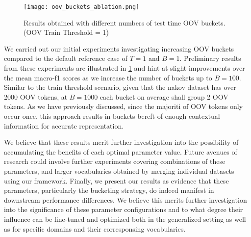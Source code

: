 \documentclass[../../fyp.tex]{subfiles}
\begin{document}
\begin{figure}[!ht]
	\centering
	\texttt{[image: oov\_buckets\_ablation.png]}
	\caption{Results obtained with different numbers of test time OOV buckets. (OOV Train Threshold = 1)}
	\label{fig:oov_threshold_ablation}
\end{figure}

We carried out our initial experiments investigating increasing OOV buckets compared to the default reference case of $T=1$ and $B=1$. Preliminary results from these experiments are illustrated in \ref{fig:oov_threshold_ablation} and hint at slight improvements over the mean macro-f1 scores as we increase the number of buckets up to $B=100$. Similar to the train threshold scenario, given that the nakov dataset has over 2000 OOV tokens, at $B=1000$ each bucket on average shall group 2 OOV tokens. As we have previously discussed, since the majoriti of OOV tokens only occur once, this approach results in buckets bereft of enough contextual information for accurate representation. 

We believe that these results merit further investigation into the possibility of accumulating the benefits of each optimal parameter value. Future avenues of research could involve further experiments covering combinations of these parameters, and larger vocabularies obtained by merging individual datasets using our framework. Finally, we present our results as evidence that these parameters, particularly the bucketing strategy, do indeed manifest in downstream performance differences. We believe this merits further investigation into the significance of these parameter configurations and to what degree their influence can be fine-tuned and optimized both in the generalized setting as well as for specific domains and their corresponsing vocabularies.
\end{document}
